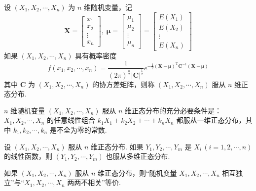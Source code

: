 设 $(X_1,X_2,\cdots,X_n)$ 为 $n$ 维随机变量，记
$$
\boldsymbol{X} = \begin{bmatrix}
    x_1 \\
    x_2 \\
    \vdots \\
    x_n
\end{bmatrix}, \;
\boldsymbol{\mu} = \begin{bmatrix}
    \mu_1 \\
    \mu_2 \\
    \vdots \\
    \mu_n
\end{bmatrix} = \begin{bmatrix}
    E(X_1) \\
    E(X_2) \\
    \vdots \\
    E(X_n)
\end{bmatrix}
$$
如果 $(X_1,X_2,\cdots,X_n)$ 具有概率密度
$$
f(x_1,x_2,\cdots,x_n) = \dfrac{1}{(2\pi)^{\frac{n}{2}} |\boldsymbol{C}|^{\frac{1}{2}}} e^{-\frac{1}{2} (\boldsymbol{X} - \boldsymbol{\mu})^{\text{T}} \boldsymbol{C}^{-1} (\boldsymbol{X} - \boldsymbol{\mu})}
$$
其中 $\boldsymbol{C}$ 为 $(X_1,X_2,\cdots,X_n)$ 的协方差矩阵，则称 $(X_1,X_2,\cdots,X_n)$ 服从 $n$ 维正态分布.

\setcounter{propertyname}{0}

\begin{property}
    $n$ 维随机变量 $(X_1,X_2,\cdots,X_n)$ 服从 $n$ 维正态分布的充分必要条件是：\\
    $X_1,X_2,\cdots,X_n$ 的任意线性组合 $k_1 X_1 + k_2 X_2 + \cdots + k_n X_n$ 都服从一维正态分布，其中 $k_1,k_2,\cdots,k_n$ 是不全为零的常数.
\end{property}

\begin{property}
    设 $(X_1,X_2,\cdots,X_n)$ 服从 $n$ 维正态分布. 如果 $Y_1,Y_2,\cdots,Y_m$ 是 $X_i \, (i=1,2,\cdots,n)$ 的线性函数，则 $(Y_1,Y_2,\cdots,Y_m)$ 也服从多维正态分布.
\end{property}

\begin{property}
    如果 $(X_1,X_2,\cdots,X_n)$ 服从 $n$ 维正态分布，则“随机变量 $X_1,X_2,\cdots,X_n$ 相互独立”与“$X_1,X_2,\cdots,X_n$ 两两不相关”等价.
\end{property}